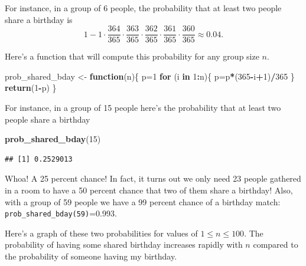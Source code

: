 \documentclass[
]{book}
\newenvironment{Shaded}{\begin{snugshade}}{\end{snugshade}}
\newcommand{\ControlFlowTok}[1]{\textcolor[rgb]{0.13,0.29,0.53}{\textbf{#1}}}
\newcommand{\DecValTok}[1]{\textcolor[rgb]{0.00,0.00,0.81}{#1}}
\newcommand{\FunctionTok}[1]{\textcolor[rgb]{0.13,0.29,0.53}{\textbf{#1}}}
\newcommand{\NormalTok}[1]{#1}
\newcommand{\OtherTok}[1]{\textcolor[rgb]{0.56,0.35,0.01}{#1}}
\newcommand{\SpecialCharTok}[1]{\textcolor[rgb]{0.81,0.36,0.00}{\textbf{#1}}}
\theoremstyle{definition}
\theoremstyle{definition}
\theoremstyle{definition}
\theoremstyle{definition}
\theoremstyle{remark}
\begin{document}
For instance, in a group of 6 people, the probability that at least two people share a birthday is \[1-1 \cdot \frac{364}{365}\cdot\frac{363}{365}\cdot \frac{362}{365}\cdot\frac{361}{365}\cdot\frac{360}{365}\approx0.04.\]

Here's a function that will compute this probability for any group size \(n\).

\begin{Shaded}
\begin{Highlighting}[]
\NormalTok{prob\_shared\_bday }\OtherTok{\textless{}{-}} \ControlFlowTok{function}\NormalTok{(n)\{}
\NormalTok{  p}\OtherTok{=}\DecValTok{1}
  \ControlFlowTok{for}\NormalTok{ (i }\ControlFlowTok{in} \DecValTok{1}\SpecialCharTok{:}\NormalTok{n)\{}
\NormalTok{    p}\OtherTok{=}\NormalTok{p}\SpecialCharTok{*}\NormalTok{(}\DecValTok{365}\SpecialCharTok{{-}}\NormalTok{i}\SpecialCharTok{+}\DecValTok{1}\NormalTok{)}\SpecialCharTok{/}\DecValTok{365}
\NormalTok{    \}}
  \FunctionTok{return}\NormalTok{(}\DecValTok{1}\SpecialCharTok{{-}}\NormalTok{p)}
\NormalTok{\}}
\end{Highlighting}
\end{Shaded}

For instance, in a group of 15 people here's the probability that at least two people share a birthday

\begin{Shaded}
\begin{Highlighting}[]
\FunctionTok{prob\_shared\_bday}\NormalTok{(}\DecValTok{15}\NormalTok{)}
\end{Highlighting}
\end{Shaded}

\begin{verbatim}
## [1] 0.2529013
\end{verbatim}

Whoa! A 25 percent chance! In fact, it turns out we only need 23 people gathered in a room to have a 50 percent chance that two of them share a birthday! Also, with a group of 59 people we have a 99 percent chance of a birthday match: \texttt{prob\_shared\_bday(59)}=0.993.

Here's a graph of these two probabilities for values of \(1 \leq n \leq 100\). The probability of having some shared birthday increases rapidly with \(n\) compared to the probability of someone having my birthday.
\end{document}
